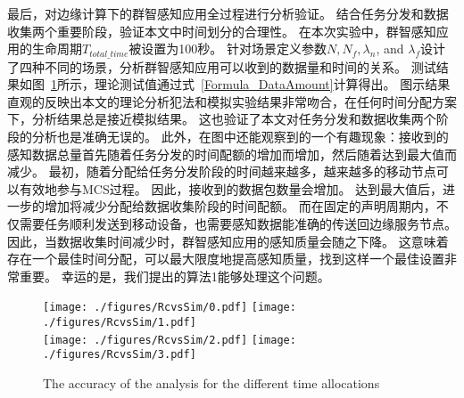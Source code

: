 
最后，对边缘计算下的群智感知应用全过程进行分析验证。
结合任务分发和数据收集两个重要阶段，验证本文中时间划分的合理性。
在本次实验中，群智感知应用的生命周期$T_{total\_time}$被设置为100秒。
针对场景定义参数$N, N_f, \lambda_n$, and $\lambda_f$设计了四种不同的场景，分析群智感知应用可以收到的数据量和时间的关系。
测试结果如图~\ref{Figure_EntireTest}所示，理论测试值通过式~\eqref{Formula_DataAmount}计算得出。
图示结果直观的反映出本文的理论分析犯法和模拟实验结果非常吻合，在任何时间分配方案下，分析结果总是接近模拟结果。
这也验证了本文对任务分发和数据收集两个阶段的分析也是准确无误的。
此外，在图中还能观察到的一个有趣现象：接收到的感知数据总量首先随着任务分发的时间配额的增加而增加，然后随着达到最大值而减少。
最初，随着分配给任务分发阶段的时间越来越多，越来越多的移动节点可以有效地参与MCS过程。
因此，接收到的数据包数量会增加。
达到最大值后，进一步的增加将减少分配给数据收集阶段的时间配额。
而在固定的声明周期内，不仅需要任务顺利发送到移动设备，也需要感知数据能准确的传送回边缘服务节点。
因此，当数据收集时间减少时，群智感知应用的感知质量会随之下降。
这意味着存在一个最佳时间分配，可以最大限度地提高感知质量，找到这样一个最佳设置非常重要。
幸运的是，我们提出的算法1能够处理这个问题。

\begin{figure}[!h]
  \centering
  {\texttt{[image: ./figures/RcvsSim/0.pdf]}}
  {\texttt{[image: ./figures/RcvsSim/1.pdf]}}\\
  {\texttt{[image: ./figures/RcvsSim/2.pdf]}}
  {\texttt{[image: ./figures/RcvsSim/3.pdf]}}
  \vspace{-1em}
  \caption{The accuracy of the analysis for the different time allocations}
  \label{Figure_EntireTest}
\end{figure}

